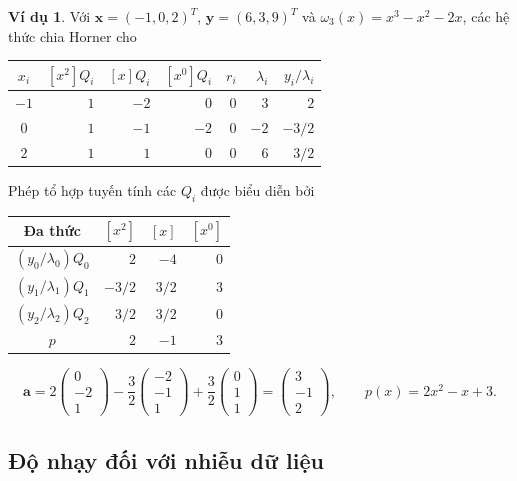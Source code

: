 \documentclass[12pt,a4paper,oneside]{book}
\numberwithin{algorithm}{chapter}
\theoremstyle{definition}
\newtheorem{vidu}{Ví dụ}[chapter]
\begin{document}
\begin{vidu}
Với $\mathbf x=(-1,0,2)^T$, $\mathbf y=(6,3,9)^T$ và $\omega_3(x)=x^3-x^2-2x$, các hệ thức chia Horner cho
\begin{center}
\begin{tabular}{c|rrr|r|r|r}
\toprule
$x_i$ & $[x^2]Q_i$ & $[x]Q_i$ & $[x^0]Q_i$ & $r_i$ & $\lambda_i$ & $y_i/\lambda_i$\\
\midrule
$-1$ & $1$ & $-2$ & $0$ & $0$ & $3$ & $2$\\
$0$ & $1$ & $-1$ & $-2$ & $0$ & $-2$ & $-3/2$\\
$2$ & $1$ & $1$ & $0$ & $0$ & $6$ & $3/2$\\
\bottomrule
\end{tabular}
\end{center}
Phép tổ hợp tuyến tính các $Q_i$ được biểu diễn bởi
\begin{center}
\begin{tabular}{c|rrr}
\toprule
Đa thức & $[x^2]$ & $[x]$ & $[x^0]$\\
\midrule
$(y_0/\lambda_0)Q_0$ & $2$ & $-4$ & $0$\\
$(y_1/\lambda_1)Q_1$ & $-3/2$ & $3/2$ & $3$\\
$(y_2/\lambda_2)Q_2$ & $3/2$ & $3/2$ & $0$\\
\midrule
$p$ & $\boxed{2}$ & $\boxed{-1}$ & $\boxed{3}$\\
\bottomrule
\end{tabular}
\end{center}
\[
 \mathbf a
 =2\begin{pmatrix}0\\-2\\1\end{pmatrix}
  -\frac32\begin{pmatrix}-2\\-1\\1\end{pmatrix}
  +\frac32\begin{pmatrix}0\\1\\1\end{pmatrix}
 =\begin{pmatrix}3\\-1\\2\end{pmatrix},\qquad
 p(x)=2x^2-x+3.
\]
\end{vidu}

\subsection{Độ nhạy đối với nhiễu dữ liệu}
\end{document}
